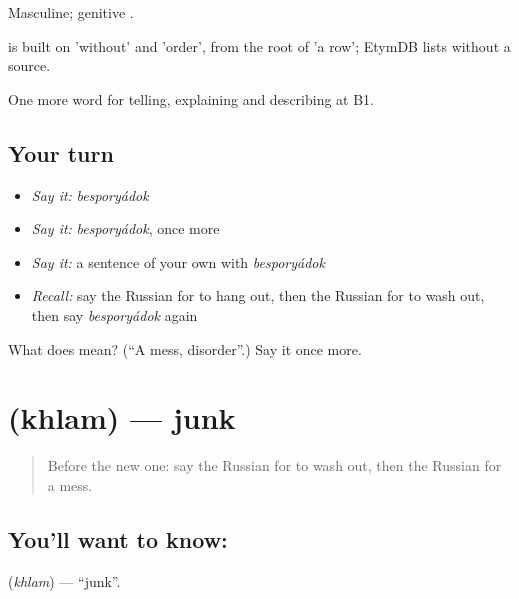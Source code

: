 Masculine; genitive .

\begin{cousinweb}
\emph{} is built on \emph{} 'without' and \emph{} 'order', from the root of \emph{} 'a row'; EtymDB lists \emph{} without a source.
\end{cousinweb}

\begin{grammarlens}[title={What you've built}]
One more word for telling, explaining and describing at B1.
\end{grammarlens}

\subsection*{Your turn}
\begin{itemize}
\raggedright
  \item \emph{Say it:} \emph{besporyádok}
  \item \emph{Say it:} \emph{besporyádok}, once more
  \item \emph{Say it:} a sentence of your own with \emph{besporyádok}
  \item \emph{Recall:} say the Russian for to hang out, then the Russian for to wash out, then say \emph{besporyádok} again
\end{itemize}

\begin{tcolorbox}[breakable,colback=teal!4,colframe=teal!35!black,title={Before you move on}]
What does  mean? (\textquotedblleft{}A mess, disorder\textquotedblright{}.) Say it once more.
\end{tcolorbox}
\section[\texorpdfstring{\ru{хлам} (khlam)}{хлам (khlam)}]{ (khlam) — junk}

\label{lesson:RU-C531-khlam}



\begin{quote}
Before the new one: say the Russian for to wash out, then the Russian for a mess.
\end{quote}

\subsection*{You'll want to know: }
\textbf{} (\emph{khlam}) — \textquotedblleft{}junk\textquotedblright{}.

